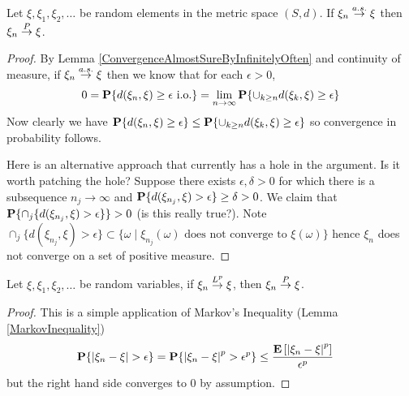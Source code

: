 \begin{lem}\label{ConvergenceAlmostSureImpliesInProbability}Let $\xi, \xi_1, \xi_2, \dots$ be random elements in the
  metric space $(S,d)$.  If $\xi_n \overset{a.s.}\to \xi$ then $\xi_n \overset{P}\to \xi$.
\end{lem}
\begin{proof}
By Lemma \ref{ConvergenceAlmostSureByInfinitelyOften} and continuity of measure, if $\xi_n \overset{a.s.}\to \xi$ then we know that for each
$\epsilon > 0$, 
\begin{align*} 
0=\textbf{P}\{d(\xi_n, \xi) \geq
  \epsilon \text{ i.o.}\}=\lim_{n \to \infty} \textbf{P}\{\cup_{k\geq
    n} {d(\xi_k, \xi) \geq
  \epsilon}\}
\end{align*}
Now clearly we have $\textbf{P}\{d(\xi_n, \xi) \geq
  \epsilon\} \leq \textbf{P}\{\cup_{k \geq n} d(\xi_k, \xi) \geq
  \epsilon\}$ so convergence in probability follows.

Here is an alternative approach that currently has a hole in the
argument.  Is it worth patching the hole?  Suppose there exists $\epsilon , \delta >
0$ for which there is a subsequence $n_j \to \infty$ and
$\textbf{P}\{d(\xi_{n_j}, \xi) > \epsilon\} \geq \delta > 0$.  We
claim that $\textbf{P}\{\cap_j \lbrace d(\xi_{n_j}, \xi) > \epsilon
  \rbrace \} > 0$ (is this really true?).  Note $\cap_j \lbrace d(\xi_{n_j}, \xi) > \epsilon \rbrace  \subset \{ \omega \mid \xi_{n_j}(\omega) \text{ does not converge
  to }  \xi(\omega) \}$ hence $\xi_n$ does not converge on a set of
positive measure.
\end{proof}

\begin{lem}\label{ConvergenceInMeanImpliesInProbability}Let $\xi,
  \xi_1, \xi_2, \dots$ be random variables, if $\xi_n \overset{L^p}\to \xi$, then $\xi_n \overset{P}\to \xi$.
\end{lem}
\begin{proof}
This is a simple application of Markov's Inequality (Lemma \ref{MarkovInequality})
\begin{align*}
\textbf{P}\{\left \vert \xi_n - \xi \right \vert > \epsilon\} &= \textbf{P}\{\left \vert \xi_n
    - \xi \right \vert^p > \epsilon^p\} \leq \frac{\textbf{E}\left[\left \vert \xi_n
    - \xi \right \vert^p\right]}{\epsilon^p}
\end{align*}
but the right hand side converges to $0$ by assumption.
\end{proof}

